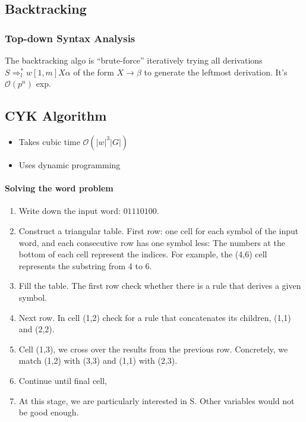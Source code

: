 \documentclass[a3paper, 8pt]{extarticle}
\begin{document}
\begin{multicols*}{6}
\subsection{Backtracking}

\subsubsection{Top-down Syntax Analysis}
The backtracking algo is “brute-force” iteratively trying all derivations $ S \Rightarrow_l^* w[1,m] X \alpha$ of the form $X\to \beta$ to generate the leftmost derivation. It's $\mathcal{O}(p^n)$ exp.

\subsection{CYK Algorithm}
\begin{itemize}
    \item Takes cubic time $\mathcal{O}(|w|^3|G|)$
    \item Uses dynamic programming
\end{itemize}

\paragraph{Solving the word problem}
\begin{enumerate}
    \item Write down the input word: $01110100$.
    \item Construct a triangular table. First row: one cell for each symbol of the input word, and each consecutive row has one symbol less: %
    The numbers at the bottom of each cell represent the indices. For example, the (4,6) cell represents the substring from 4 to 6.
    \item Fill the table. The first row check whether there is a rule that derives a given symbol.
    \item Next row. In cell (1,2) check for a rule that concatenates its children, (1,1) and (2,2).
    \item Cell (1,3), we cross over the results from the previous row. Concretely, we match (1,2) with (3,3) and (1,1) with (2,3).
    \item Continue until final cell,
    \item At this stage, we are particularly interested in S. Other variables would not be good enough.
\end{enumerate}


\end{multicols*}
\end{document}
